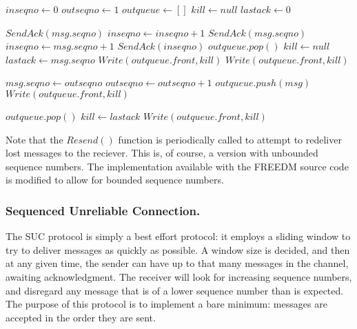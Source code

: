 \begin{algorithmic}

\State $inseqno \gets 0$
\State $outseqno \gets 1$
\State $outqueue \gets []$
\State $kill \gets null$
\State $lastack \gets 0$

            \State $SendAck(msg.seqno)$
            \State $inseqno \gets inseqno + 1$
            \State $SendAck(msg.seqno)$
            \State $inseqno \gets msg.seqno + 1$
        \Else
            \State $SendAck(inseqno)$
        \EndIf
            \State $outqueue.pop()$
            \State $kill \gets null$
            \State $lastack \gets msg.seqno$
            \State $Write(outqueue.front,kill)$
        \Else
            \State $Write(outqueue.front,kill)$
        \EndIf
    \EndIf
\EndFunction

    \State $msg.seqno \gets outseqno$
    \State $outseqno \gets outseqno+1$
    \State $outqueue.push(msg)$
        \State $Write(outqueue.front,kill)$
    \EndIf
\EndFunction

        \State $outqueue.pop()$
        \State $kill \gets lastack$
    \EndWhile
        \State $Write(outqueue.front,kill)$    
    \EndIf
\EndFunction

\end{algorithmic}

Note that the $Resend()$ function is periodically called to attempt to redeliver
lost messages to the reciever. This is, of course, a version with unbounded
sequence numbers. The implementation available with the FREEDM source code is
modified to allow for bounded sequence numbers.

\subsubsection{Sequenced Unreliable Connection.}

The SUC protocol is simply a best effort protocol: it employs a sliding window 
to try to deliver messages as quickly as possible. A window size is decided, 
and then at any given time, the sender can have up to that many messages in the 
channel, awaiting acknowledgment. The receiver will look for increasing 
sequence numbers, and disregard any message that is of a lower sequence number 
than is expected. The purpose of this protocol is to implement a bare minimum: 
messages are accepted in the order they are sent.


